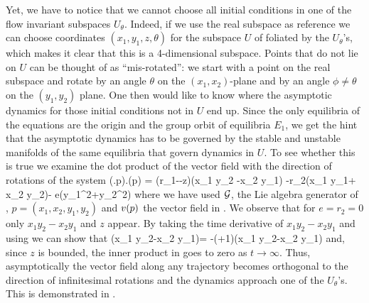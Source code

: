 Yet, we have to notice that we cannot choose all initial conditions
in one of the flow invariant subspaces $U_\theta$. Indeed, if we use the real subspace
as reference we can choose coordinates $(x_1,y_1,z,\theta)$ for the subspace $U$ of  
foliated by the $U_\theta$'s, which makes it clear that this is a 4-dimensional subspace.
Points that do not lie on $U$ can be thought of as ``mis-rotated'': we start with a point on
the real subspace and rotate by an angle $\theta$ on the $(x_1,x_2)$-plane and by an
angle $\phi\neq\theta$ on the $(y_1,y_2)$ plane. One then would like to know where the asymptotic dynamics
for those initial conditions not in $U$ end up. Since the only equilibria of the equations are the origin
and the group orbit of equilibria $E_1$, we get the hint that the asymptotic dynamics has to be governed
by the stable and unstable manifolds of the same equilibria that govern dynamics in $U$.
To see whether this is true we examine the dot product of the vector field with the direction of
rotations of the system
\beq
	(\Lg.p).\vf(p) = \left(r_1-\sigma-z\right)\left(x_1 y_2 -x_2 y_1\right) -r_2\left(x_1 y_1+ x_2 y_2\right)- e\left(y_1^2+y_2^2\right)
	\label{eq:CLe0ip}
\eeq
where we have used $\mathcal{G}$, the Lie algebra generator of , $p=(x_1,x_2,y_1,y_2)$ and $v(p)$ the vector field in .
We observe that for $e=r_2=0$ only $x_1 y_2-x_2 y_1$ and $z$ appear. By taking the time derivative of $x_1 y_2-x_2 y_1$ and using  
we can show that
\beq
	\left(x_1 y_2-x_2 y_1\right)= -(\sigma+1)\left(x_1 y_2-x_2 y_1\right)
\eeq
and, since $z$ is bounded, the inner product in  goes to zero as $t\rightarrow\infty$. Thus, asymptotically the vector
field along any trajectory becomes orthogonal to the direction of infinitesimal rotations and the dynamics approach one of the $U_\theta$'s.
This is demonstrated in .

